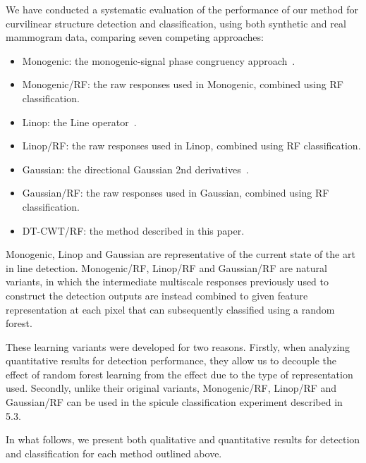 We have conducted a systematic evaluation of the performance of our method for curvilinear structure detection and classification, using both synthetic and real mammogram data, comparing seven competing approaches:

\begin{itemize}
\item Monogenic: the monogenic-signal phase congruency approach~\cite{Wai_etal_MICCAI04}.
\item	Monogenic/RF: the raw responses used in Monogenic, combined using RF classification.
\item Linop: the Line operator~\cite{Dixon_Taylor_IPC79,Parr_etal_SPIE97}.
\item	Linop/RF: the raw responses used in Linop, combined using RF classification.
\item	Gaussian: the directional Gaussian 2nd derivatives~\cite{Karssemeijer_teBrake_TMI96}.
\item Gaussian/RF: the raw responses used in Gaussian, combined using RF classification.
\item DT-CWT/RF: the method described in this paper.
\end{itemize}

Monogenic, Linop and Gaussian are representative of the current state of the art in line detection. Monogenic/RF, Linop/RF and Gaussian/RF are natural variants, in which the intermediate multiscale responses previously used to construct the detection outputs are instead combined to given feature representation at each pixel that can subsequently classified using a random forest. 

These learning variants were developed for two reasons. Firstly, when analyzing quantitative results for detection performance, they allow us to decouple the effect of random forest learning from the effect due to the type of representation used. Secondly, unlike their original variants, Monogenic/RF, Linop/RF and Gaussian/RF can be used in the spicule classification experiment described in 5.3.

In what follows, we present both qualitative and quantitative results for detection and classification for each method outlined above. 